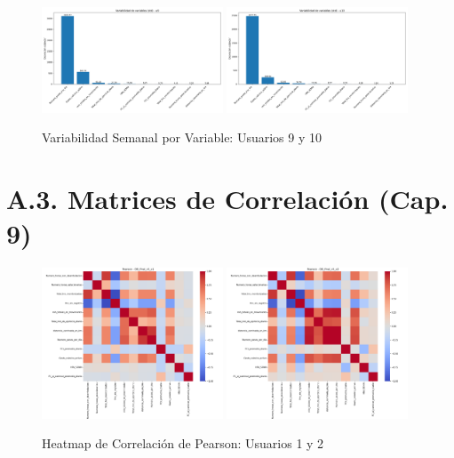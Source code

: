 \documentclass[12pt,letterpaper,twoside]{report}
\begin{document}
\begin{figure}[H]
\centering
\includegraphics[width=0.48\textwidth]{figuras/variabilidad_variables_u9.png}
\includegraphics[width=0.48\textwidth]{figuras/variabilidad_variables_u10.png}
\caption{Variabilidad Semanal por Variable: Usuarios 9 y 10}
\end{figure}

\clearpage

\section*{A.3. Matrices de Correlación (Cap. 9)}

\begin{figure}[H]
\centering
\includegraphics[width=0.48\textwidth]{figuras/DB_final_v3_u1_heatmap_pearson.png}
\includegraphics[width=0.48\textwidth]{figuras/DB_final_v3_u2_heatmap_pearson.png}
\caption{Heatmap de Correlación de Pearson: Usuarios 1 y 2}
\end{figure}
\end{document}
